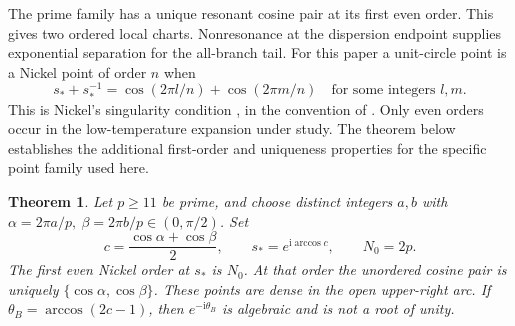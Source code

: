 \documentclass[11pt]{article}
\numberwithin{equation}{section}
\newtheorem{theorem}{Theorem}[section]
\theoremstyle{definition}
\newcommand{\ii}{\mathrm i}
\newcommand{\sstar}{s_*}
\begin{document}
The prime family has a unique resonant cosine pair at its first even
order. This gives two ordered local charts. Nonresonance at the
dispersion endpoint supplies exponential separation for the
all-branch tail.
For this paper a unit-circle point is a Nickel point of order \(n\)
when
\[
 s_*+s_*^{-1}
   =\cos(2\pi l/n)+\cos(2\pi m/n)
 \quad\text{for some integers }l,m.
\]
This is Nickel's singularity condition
\cite{Nickel1999,Nickel2000}, in the convention of \cite{TW2014}.
Only even orders occur in the low-temperature expansion under study.
The theorem below establishes the additional first-order and uniqueness
properties for the specific point family used here.
\begin{theorem}\label{thm:prime}
Let \(p\ge11\) be prime, and choose distinct integers \(a,b\) with
\(\alpha=2\pi a/p,\ \beta=2\pi b/p\in(0,\pi/2)\).
Set
\[
 c=\frac{\cos\alpha+\cos\beta}{2},\qquad
 \sstar=e^{\ii\arccos c},\qquad N_0=2p.
\]
The first even Nickel order at \(\sstar\) is \(N_0\).
At that order the unordered cosine pair is uniquely
\(\{\cos\alpha,\cos\beta\}\).
These points are dense in the open upper-right arc.
If \(\theta_B=\arccos(2c-1)\), then \(e^{-\ii\theta_B}\) is algebraic
and is not a root of unity.
\end{theorem}
\end{document}
